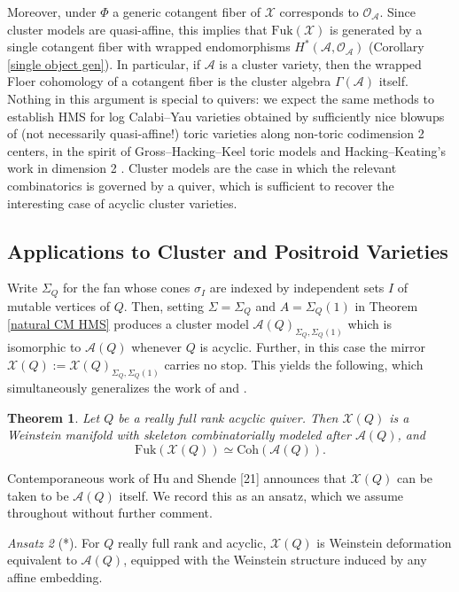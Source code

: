 \documentclass[11pt]{amsart}
\newtheorem{thm}{Theorem}[section]
\theoremstyle{definition}
\theoremstyle{remark}
\newtheorem{ansatz}[thm]{Ansatz}
\newcommand{\X}{\mathcal{X}}
\newcommand{\Coh}{\mathrm{Coh}}
\newcommand{\Fuk}{\mathrm{Fuk}}
\numberwithin{equation}{section}
\begin{document}
Moreover, under $\Phi$ a generic cotangent fiber of $\mathcal X$ corresponds to $\mathcal O_{\mathcal A}$. Since cluster models are quasi-affine, this implies that $\Fuk(\mathcal{X})$ is generated by a single cotangent fiber with wrapped endomorphisms $H^*(\mathcal{A},\mathcal{O}_{\mathcal{A}})$ (Corollary \ref{single object gen}). In particular, if $\mathcal A$ is a cluster variety, then the wrapped Floer cohomology of a cotangent fiber is the cluster algebra $\Gamma(\mathcal A)$ itself.\\

Nothing in this argument is special to quivers: we expect the same methods to establish HMS for log Calabi–Yau varieties obtained by sufficiently nice blowups of (not necessarily quasi-affine!) toric varieties along non-toric codimension 2 centers, in the spirit of Gross–Hacking–Keel toric models and Hacking–Keating’s work in dimension 2 \cite{HK}. Cluster models are the case in which the relevant combinatorics is governed by a quiver, which is sufficient to recover the interesting case of acyclic cluster varieties.

\subsection{Applications to Cluster and Positroid Varieties}

Write $\Sigma_Q$ for the fan whose cones $\sigma_I$ are indexed by independent sets $I$ of mutable vertices of $Q$. Then, setting $\Sigma=\Sigma_Q$ and $A=\Sigma_Q(1)$ in Theorem \ref{natural CM HMS} produces a cluster model $\mathcal A(Q)_{\Sigma_Q,\Sigma_Q(1)}$ which is isomorphic to $\mathcal{A}(Q)$ whenever $Q$ is acyclic. Further, in this case the mirror $\mathcal X(Q):=\mathcal X(Q)_{\Sigma_Q,\Sigma_Q(1)}$ carries no stop. This yields the following, which simultaneously generalizes the work of \cite{GL} and \cite{SSWZ}.

\begin{thm}\label{Acyclic HMS}
    Let $Q$ be a really full rank acyclic quiver. Then $\mathcal X(Q)$ is a Weinstein manifold with skeleton combinatorially modeled after $\mathcal A(Q)$, and $$\Fuk(\X(Q)) \simeq \Coh(\mathcal{A}(Q)).$$
\end{thm}

Contemporaneous work of Hu and Shende [21] announces that $\mathcal X(Q)$ can be taken to be $\mathcal A(Q)$ itself. We record this as an ansatz, which we assume throughout without further comment.

\begin{ansatz}[*]\label{*}
    For $Q$ really full rank and acyclic, $\mathcal{X}(Q)$ is Weinstein deformation equivalent to $\mathcal{A}(Q)$, equipped with the Weinstein structure induced by any affine embedding.
\end{ansatz}
\end{document}
